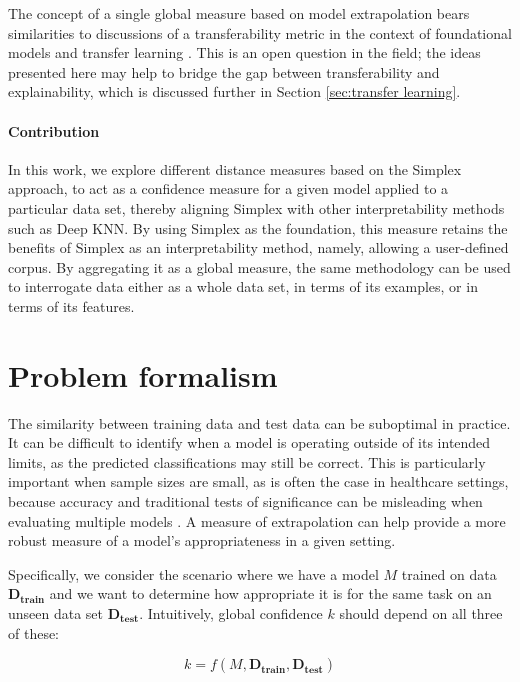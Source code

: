 \documentclass{article}
\begin{document}
The concept of a single global measure based on model extrapolation bears similarities to discussions of a transferability metric in the context of foundational models and transfer learning \cite{zhuang_comprehensive_2021} \cite{weber_transfer_2021} \cite{pan_survey_2010}. This is an open question in the field; the ideas presented here may help to bridge the gap between transferability and explainability, which is discussed further in Section \ref{sec:transfer learning}.


\paragraph{Contribution}
In this work, we explore different distance measures based on the Simplex approach, to act as a confidence measure for a given model applied to a particular data set, thereby aligning Simplex with other interpretability methods such as Deep KNN.
By using Simplex as the foundation, this measure retains the benefits of Simplex as an interpretability method, namely, allowing a user-defined corpus. By aggregating it as a global measure, the same methodology can be used to interrogate data either as a whole data set, in terms of its examples, or in terms of its features.



\section{Problem formalism}

The similarity between training data and test data can be suboptimal in practice. It can be difficult to identify when a model is operating outside of its intended limits, as the predicted classifications may still be correct.
This is particularly important when sample sizes are small, as is often the case in healthcare settings, because accuracy and traditional tests of significance can be misleading when evaluating multiple models \cite{harvey_multiple_2013}. A measure of extrapolation can help provide a more robust measure of a model's appropriateness in a given setting.

Specifically, we consider the scenario where we have a model $M$ trained on data $\bm{D_{train}}$ and we want to determine how appropriate it is for the same task on an unseen data set $\bm{D_{test}}$. Intuitively, global confidence $k$ should depend on all three of these:

\begin{equation}\label{general_confidence_form}
	k = f(M, \bm{D_{train}}, \bm{D_{test}})
\end{equation}
\end{document}
